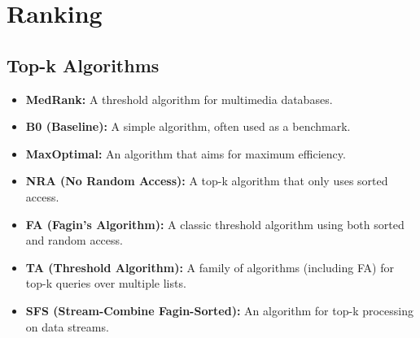 
\section*{Ranking}

\subsection*{Top-k Algorithms}
\begin{itemize}
    \item \textbf{MedRank:} A threshold algorithm for multimedia databases.
    \item \textbf{B0 (Baseline):} A simple algorithm, often used as a benchmark.
    \item \textbf{MaxOptimal:} An algorithm that aims for maximum efficiency.
    \item \textbf{NRA (No Random Access):} A top-k algorithm that only uses sorted access.
    \item \textbf{FA (Fagin's Algorithm):} A classic threshold algorithm using both sorted and random access.
    \item \textbf{TA (Threshold Algorithm):} A family of algorithms (including FA) for top-k queries over multiple lists.
    \item \textbf{SFS (Stream-Combine Fagin-Sorted):} An algorithm for top-k processing on data streams.
\end{itemize}
